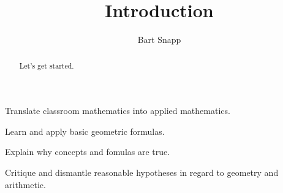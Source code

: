 \documentclass[handout,nooutcomes,noauthor]{ximera}
\title{Introduction}
\author{Bart Snapp}
\begin{document}
\begin{abstract}
  Let's get started.
\end{abstract}
\maketitle


\begin{listSectionOutcomes}
\item Translate classroom mathematics into applied mathematics. %
\item Learn and apply basic geometric formulas.
\item Explain why concepts and fomulas are true.
\item Critique and dismantle reasonable hypotheses in regard to
  geometry and arithmetic.
\end{listSectionOutcomes}




\end{document}
